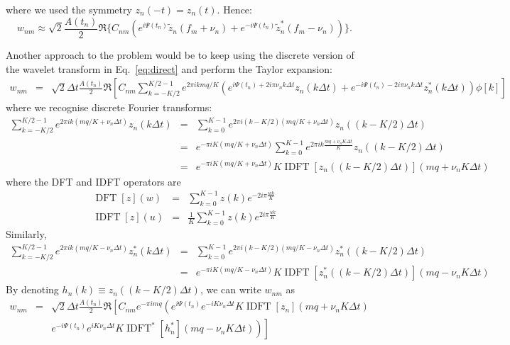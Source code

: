 \documentclass{article}
\begin{document}
where we used the symmetry $z_n(-t) = z_n(t)$. Hence:
\begin{equation}
    \boxed{ w_{n m} \approx \sqrt{2} \frac{A(t_n)}{2}  \Re\Big\{ C_{n m} \left(  e^{i\Psi(t_n)}  \tilde{z}_n(f_{m} +\nu_n ) + e^{-i\Psi(t_n)} \tilde{z}^{\ast}_n(f_{m}-\nu_n)\right) \Big\}.}
\end{equation}

Another approach to the problem would be to keep using the discrete version of the wavelet transform in Eq.~\eqref{eq:direct} and perform the Taylor expansion:
\begin{eqnarray*}
w_{n m} & = & \sqrt{2} \Delta t \frac{A(t_n)}{2} \Re \left[C_{n m} \sum_{k=-K / 2}^{K / 2-1} e^{2\pi i k m q / K} \left( e^{i\Psi(t_n)+2 i\pi \nu_n k \Delta t}  z_n(k \Delta t) + e^{-i\Psi(t_n)-2 i\pi \nu_n k \Delta t} z^{\ast}_n(k \Delta t) \right) \phi[k]\right]
\end{eqnarray*}
where we recognise discrete Fourier transforms:
\begin{eqnarray*}
    \sum_{k=-K / 2}^{K / 2-1} e^{2 \pi i k (mq/K+\nu_n\Delta t)} z_n(k \Delta t) &=&  \sum_{k=0}^{K-1} e^{2 \pi i (k-K/2) (mq/K+\nu_n\Delta t)} z_n\left( (k-K/2) \Delta t \right) \\
    &=&  e^{- \pi i K (mq/K+\nu_n\Delta t)} \sum_{k=0}^{K-1} e^{2 \pi i k \frac{mq+\nu_n K \Delta t}{K}} z_n\left( (k-K/2) \Delta t \right) \\
    & = & e^{- \pi i K (mq/K+\nu_n\Delta t)} K \operatorname{IDFT}\left[z_n\left( (k-K/2) \Delta t \right)\right]\left(mq+\nu_n K \Delta t\right)
\end{eqnarray*}
where the DFT and IDFT operators are 
\begin{eqnarray}
    \operatorname{DFT}[z](w) & = & \sum_{k=0}^{K-1} z(k) e^{-2 i \pi \frac{wk}{K}} \nonumber \\
    \operatorname{IDFT}[z](u)  & = & \frac{1}{K} \sum_{k=0}^{K-1} z(k) e^{2 i \pi \frac{uk}{K}}
\end{eqnarray}
Similarly,
\begin{eqnarray*}
    \sum_{k=-K / 2}^{K / 2-1} e^{2 \pi i k (mq/K-\nu_n\Delta t)} z^{\ast}_n(k \Delta t) &=& \sum_{k=0}^{K-1} e^{2 \pi i (k-K/2) (mq/K-\nu_n\Delta t)} z_n^{\ast}\left((k-K/2) \Delta t\right) \\
    & = & e^{- \pi i K (mq/K-\nu_n\Delta t)} K \operatorname{IDFT}[z^{\ast}_n\left((k-K/2)\Delta t\right)](mq-\nu_n K \Delta t)
\end{eqnarray*}
By denoting $h_n(k) \equiv z_n\left( (k-K/2) \Delta t \right)$, we can write $w_{nm}$ as
\begin{eqnarray*}
w_{n m} & = & \sqrt{2} \Delta t \frac{A(t_n)}{2} \Re \left[C_{n m} e^{-\pi i m q }\left(e^{i\Psi(t_n)} e^{-i K \nu_n \Delta t } K \operatorname{IDFT}\left[z_n\right]\left(mq+\nu_n K \Delta t\right) \right. \right.\\
&& \left. \left. e^{-i\Psi(t_n)} e^{i K \nu_n \Delta t } K \operatorname{IDFT}^{\ast}\left[h^{\ast}_n\right](mq-\nu_n K \Delta t) \right) \right]
\end{eqnarray*}
\end{document}
